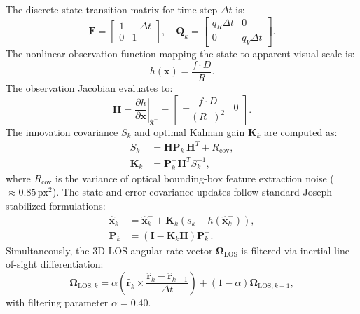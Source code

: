 \documentclass[lettersize,journal]{IEEEtran}
\begin{document}
The discrete state transition matrix for time step $\Delta t$ is:
\begin{equation}
    \mathbf{F} = \begin{bmatrix} 1 & -\Delta t \\ 0 & 1 \end{bmatrix}, \quad \mathbf{Q}_k = \begin{bmatrix} q_R \Delta t & 0 \\ 0 & q_V \Delta t \end{bmatrix}.
\end{equation}
The nonlinear observation function mapping the state to apparent visual scale is:
\begin{equation}
    h(\mathbf{x}) = \frac{f \cdot D}{R}.
\end{equation}
The observation Jacobian evaluates to:
\begin{equation}
    \mathbf{H} = \left. \frac{\partial h}{\partial \mathbf{x}} \right|_{\hat{\mathbf{x}}^-} = \begin{bmatrix} -\dfrac{f \cdot D}{(R^-)^2} & 0 \end{bmatrix}.
\end{equation}
The innovation covariance $S_k$ and optimal Kalman gain $\mathbf{K}_k$ are computed as:
\begin{align}
    S_k &= \mathbf{H} \mathbf{P}_k^- \mathbf{H}^T + R_{\text{cov}}, \\
    \mathbf{K}_k &= \mathbf{P}_k^- \mathbf{H}^T S_k^{-1},
\end{align}
where $R_{\text{cov}}$ is the variance of optical bounding-box feature extraction noise ($\approx 0.85\,\text{px}^2$). The state and error covariance updates follow standard Joseph-stabilized formulations:
\begin{align}
    \hat{\mathbf{x}}_k &= \hat{\mathbf{x}}_k^- + \mathbf{K}_k (s_k - h(\hat{\mathbf{x}}_k^-)), \\
    \mathbf{P}_k &= (\mathbf{I} - \mathbf{K}_k \mathbf{H}) \mathbf{P}_k^-.
\end{align}
Simultaneously, the 3D LOS angular rate vector $\mathbf{\Omega}_{\text{LOS}}$ is filtered via inertial line-of-sight differentiation:
\begin{equation}
    \mathbf{\Omega}_{\text{LOS}, k} = \alpha (\hat{\mathbf{r}}_k \times \frac{\hat{\mathbf{r}}_k - \hat{\mathbf{r}}_{k-1}}{\Delta t}) + (1-\alpha) \mathbf{\Omega}_{\text{LOS}, k-1},
\end{equation}
with filtering parameter $\alpha = 0.40$.
\end{document}
